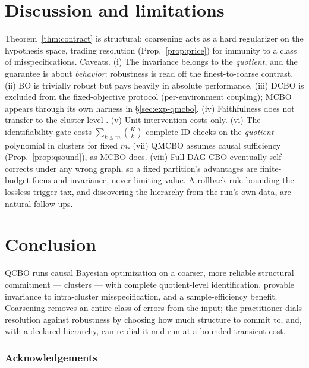 \documentclass[twoside]{article}
\newcommand{\QCBO}{\textsc{QCBO}}
\newcommand{\QMCBO}{\textsc{QMCBO}}
\newcommand{\CBO}{\textsc{CBO}}
\newcommand{\BO}{\textsc{BO}}
\begin{document}
\section{Discussion and limitations}
\label{sec:limitations}
Theorem~\ref{thm:contract} is structural: coarsening acts as a hard regularizer on the hypothesis space, trading resolution (Prop.~\ref{prop:price}) for immunity to a class of misspecifications. Caveats. (i) The invariance belongs to the \emph{quotient}, and the guarantee is about \emph{behavior}: robustness is read off the finest-to-coarse contrast. (ii) \BO{} is trivially robust but pays heavily in absolute performance. (iii) DCBO is excluded from the fixed-objective protocol (per-environment coupling); MCBO appears through its own harness in \S\ref{sec:exp-qmcbo}. (iv) Faithfulness does not transfer to the cluster level \citep{wahl2024foundations}. (v) Unit intervention costs only. (vi) The identifiability gate costs $\sum_{k\le m}\binom{K}{k}$ complete-ID checks on the \emph{quotient} --- polynomial in clusters for fixed $m$. (vii) \QMCBO{} assumes causal sufficiency (Prop.~\ref{prop:qsound}), as MCBO does. (viii) Full-DAG \CBO{} eventually self-corrects under any wrong graph, so a fixed partition's advantages are finite-budget focus and invariance, never limiting value. A rollback rule bounding the lossless-trigger tax, and discovering the hierarchy from the run's own data, are natural follow-ups.

\section{Conclusion}
\label{sec:conclusion}
\QCBO{} runs causal Bayesian optimization on a coarser, more reliable structural commitment --- clusters --- with complete quotient-level identification, provable invariance to intra-cluster misspecification, and a sample-efficiency benefit. Coarsening removes an entire class of errors from the input; the practitioner dials resolution against robustness by choosing how much structure to commit to, and, with a declared hierarchy, can re-dial it mid-run at a bounded transient cost.

\subsubsection*{Acknowledgements}

\appendix
\onecolumn
\end{document}

